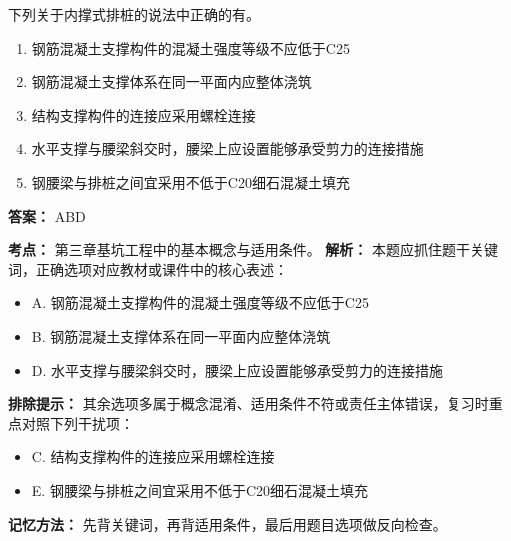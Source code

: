 \documentclass[UTF8,fontset=fandol,11pt]{ctexart}
\begin{document}
\begin{quizbox}[title={第 3 题}]
下列关于内撑式排桩的说法中正确的有。\\
\begin{enumerate}[label=\Alph*.]
\item 钢筋混凝土支撑构件的混凝土强度等级不应低于C25
\item 钢筋混凝土支撑体系在同一平面内应整体浇筑
\item 结构支撑构件的连接应采用螺栓连接
\item 水平支撑与腰梁斜交时，腰梁上应设置能够承受剪力的连接措施
\item 钢腰梁与排桩之间宜采用不低于C20细石混凝土填充
\end{enumerate}
\textbf{答案：} ABD
\vspace{0.25em}
\begin{answerbox}[title={考点解析}]
\textbf{考点：} 第三章基坑工程中的基本概念与适用条件。
\textbf{解析：} 本题应抓住题干关键词，正确选项对应教材或课件中的核心表述：
\begin{itemize}
\item A. 钢筋混凝土支撑构件的混凝土强度等级不应低于C25
\item B. 钢筋混凝土支撑体系在同一平面内应整体浇筑
\item D. 水平支撑与腰梁斜交时，腰梁上应设置能够承受剪力的连接措施
\end{itemize}
\textbf{排除提示：} 其余选项多属于概念混淆、适用条件不符或责任主体错误，复习时重点对照下列干扰项：
\begin{itemize}
\item C. 结构支撑构件的连接应采用螺栓连接
\item E. 钢腰梁与排桩之间宜采用不低于C20细石混凝土填充
\end{itemize}
\textbf{记忆方法：} 先背关键词，再背适用条件，最后用题目选项做反向检查。
\end{answerbox}
\end{quizbox}
\end{document}
